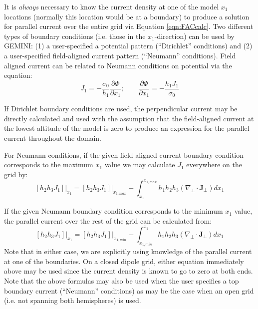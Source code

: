 \documentclass[11pt,letterpaper]{article}
\begin{document}
It is \emph{always} necessary to know the current density at one of the model $x_1$ locations (normally this location would be at a boundary) to produce a solution for parallel current over the entire grid via Equation \ref{eqn:FACcalc}.  Two different types of boundary conditions (i.e. those in the $x_1$-direction) can be used by GEMINI:  (1) a user-specified a potential pattern (``Dirichlet'' conditions) and (2) a user-specified field-aligned current pattern (``Neumann'' conditions).  Field aligned current can be related to Neumann conditions on potential via the equation:
\begin{equation}
  J_1 = - \frac{\sigma_0}{h_1} \frac{\partial \Phi}{\partial x_1}; \qquad \frac{\partial \Phi}{\partial x_1} = -\frac{h_1 J_1}{\sigma_0}
\end{equation}

If Dirichlet boundary conditions are used, the perpendicular current may be directly calculated and used with the assumption that the field-aligned current at the lowest altitude of the model is zero to produce an expression for the parallel current throughout the domain.  

For Neumann conditions, if the given field-aligned current boundary condition corresponds to the maximum $x_1$ value we may calculate $J_1$ everywhere on the grid by:
\begin{equation}
\left. \left[ h_2 h_3 J_1 \right] \right|_{x_1} = \left. \left[ h_2 h_3 J_1 \right] \right|_{x_{1,max}} + \int_{x_1}^{x_{1,max}} h_1 h_2 h_3 \left( \nabla_\perp \cdot \mathbf{J}_\perp \right) d x_1
\end{equation}

If the given Neumann boundary condition corresponds to the minimum $x_1$ value, the parallel current over the rest of the grid can be calculated from:
\begin{equation}
\left. \left[ h_2 h_3 J_1 \right] \right|_{x_1} = \left. \left[ h_2 h_3 J_1 \right] \right|_{x_{1,min}} - \int_{x_{1,min}}^{x_1} h_1 h_2 h_3 \left( \nabla_\perp \cdot \mathbf{J}_\perp \right) d x_1
\end{equation}
Note that in either case, we are explicitly using knowledge of the parallel current at one of the boundaries.  On a closed dipole grid, either equation immediately above may be used since the current density is known to go to zero at both ends.  Note that the above formulas may also be used when the user specifies a top boundary current (``Neumann'' conditions) as may be the case when an open grid (i.e. not spanning both hemispheres) is used.  
\end{document}
